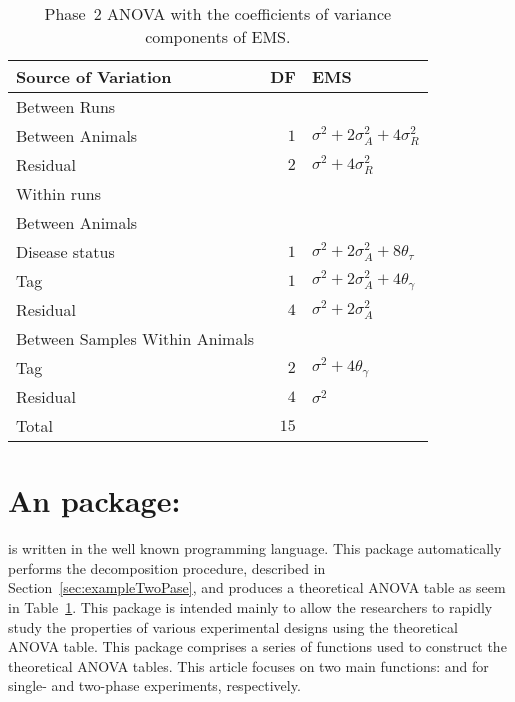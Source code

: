 \documentclass[article]{jss}
\begin{document}
\begin{table}[ht]
\centering
\caption{Phase~2 ANOVA with the coefficients of variance components of EMS.}
\begin{tabular}[t]{lrl}
\toprule
\multicolumn{1}{l}{\textbf{Source of Variation}} & \multicolumn{1}{l}{\textbf{DF}} & \multicolumn{1}{l}{\textbf{EMS}}\\
\midrule
Between Runs 		\\
\quad Between Animals & $1$ 	& $\sigma^2 + 2\sigma_{A}^2 + 4\sigma_{R}^2$\\
\quad Residual		& $2$ 	& $\sigma^2 + 4\sigma_{R}^2$\\
\hline
Within runs 				\\
\quad Between Animals \\
\quad\quad Disease status  & $1$ 	& $\sigma^2 + 2\sigma_{A}^2 + 8\theta_{\tau}$\\
\quad\quad Tag				& $1$ 	& $\sigma^2 + 2\sigma_{A}^2 + 4\theta_{\gamma}$\\
\quad\quad Residual		& $4$ 	& $\sigma^2 + 2\sigma_{A}^2$\\\hline
\quad Between Samples Within Animals		&\\
\quad\quad Tag				& $2$ 	& $\sigma^2 + 4\theta_{\gamma}$\\
\quad\quad Residual		& $4$ 	& $\sigma^2$\\
\hline
Total 						& $15$      & \\
\bottomrule
\end{tabular}
\label{tab:Phase2ANOVA}
\end{table}


\section[InfoDecompuTE]{An  package: } \label{sec:package}
 is written in the well known  programming language. This package automatically performs the decomposition procedure, described in Section~\ref{sec:exampleTwoPase}, and produces a theoretical ANOVA table as seem in Table~\ref{tab:Phase2ANOVA}. This package is intended mainly to allow the researchers to rapidly study the properties of various experimental designs using the theoretical ANOVA table. This package comprises a series of functions used to construct the theoretical ANOVA tables. This article focuses on two main functions:  and  for single- and two-phase experiments, respectively. 
\end{document}
